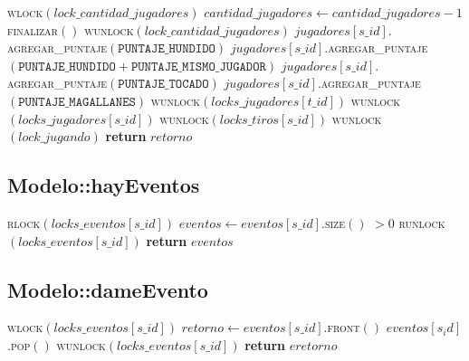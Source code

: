 \documentclass[a4paper,10pt,twoside]{article}
\newenvironment{pseudo}[1][]{%
    \vspace{0.5em}%
    \begin{algorithmic}%
}
{%
    \end{algorithmic}%
    \vspace{0.5em}%
}
\newcommand{\Fn}[2]{\textsc{#1}$(#2)$}
\newcommand{\PReturn}[1]{\textbf{return} $#1$}
\begin{document}
\begin{pseudo}
                    \State \Fn{wlock}{lock\_cantidad\_jugadores}
                    \State $cantidad\_jugadores \leftarrow cantidad\_jugadores - 1$
                        \State \Fn{finalizar}{}
                    \EndIf
                    \State \Fn{wunlock}{lock\_cantidad\_jugadores}
                \EndIf
            \EndIf
                \State $jugadores[s\_id].$\Fn{agregar\_puntaje}{\texttt{PUNTAJE\_HUNDIDO}}
                \State $jugadores[s\_id].$\Fn{agregar\_puntaje}{\texttt{PUNTAJE\_HUNDIDO} + \texttt{PUNTAJE\_MISMO\_JUGADOR}}
                \State $jugadores[s\_id].$\Fn{agregar\_puntaje}{\texttt{PUNTAJE\_TOCADO}}
                \State $jugadores[s\_id].$\Fn{agregar\_puntaje}{\texttt{PUNTAJE\_MAGALLANES}}
            \EndIf
            \State
            \State \Fn{wunlock}{locks\_jugadores[t\_id]}
            \State \Fn{wunlock}{locks\_jugadores[s\_id]}
        \EndIf
        \State
        \State \Fn{wunlock}{locks\_tiros[s\_id]}
        \State \Fn{wunlock}{lock\_jugando}
        \State
        \State \PReturn{retorno}
    \EndProcedure
\end{pseudo}


\subsection{Modelo::hayEventos}

\begin{pseudo}
        \State \Fn{rlock}{locks\_eventos[s\_id]}
        \State $eventos \leftarrow eventos[s\_id]$.\Fn{size}{} $> 0$
        \State \Fn{runlock}{locks\_eventos[s\_id]}
        \State \PReturn{eventos}
    \EndProcedure
\end{pseudo}


\subsection{Modelo::dameEvento}

\begin{pseudo}
        \State \Fn{wlock}{locks\_eventos[s\_id]}
        \State $retorno \leftarrow eventos[s\_id]$.\Fn{front}{}
        \State $eventos[s_id]$.\Fn{pop}{}
        \State \Fn{wunlock}{locks\_eventos[s\_id]}
        \State \PReturn{eretorno}
    \EndProcedure
\end{pseudo}
\end{document}
